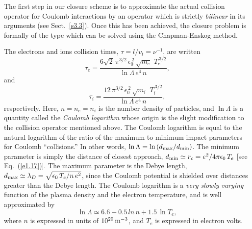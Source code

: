 The first step in our closure scheme is to approximate the actual collision
operator for Coulomb interactions by an operator which is strictly
{\em bilinear}\/ in its arguments (see Sect.~\ref{s3.3}). Once this has been achieved,
the closure problem is formally of the type which can be solved using the
Chapman-Enskog method. 

The electrons and ions collision times, $\tau = l/v_t = \nu^{-1}$, are
written
\begin{equation}\label{e3.74}
\tau_e = \frac{6\sqrt{2}\,\pi^{3/2}\,\epsilon_0^{~2}\,\sqrt{m_e}\,\,T_e^{~3/2}}
{\ln\Lambda\, e^4\, n},
\end{equation}
and
\begin{equation}\label{e3.75}
\tau_i = \frac{ 12\,\pi^{3/2}\,\epsilon_0^{~2}\,\sqrt{m_i}\,\,T_i^{~3/2}}
{\ln\Lambda\, e^4\, n},
\end{equation}
respectively. 
Here, $n=n_e=n_i$ is the number density of particles, and $\ln\Lambda$ is a quantity
called the {\em Coulomb logarithm}\/ whose origin is  the slight modification to the
collision operator  mentioned above. The Coulomb logarithm is equal to
the natural logarithm of the ratio of the maximum to minimum impact parameters
for Coulomb ``collisions.'' In other words, $\ln\Lambda=\ln\,(d_{\rm max}/d_{\rm min})$.
The minimum parameter is simply the distance of closest approach,
$d_{\rm min} \simeq r_c= e^2/4\pi\epsilon_0\,T_e$ [see Eq.~(\ref{e1.17})]. The
maximum parameter is the Debye length, $d_{\rm max} \simeq 
\lambda_D=\sqrt{\epsilon_0\,T_e/
n\,e^2}$, since the Coulomb potential is shielded over distances greater than
the Debye length. The Coulomb logarithm is a {\em very slowly varying}\/  function
of the plasma density and the electron temperature, and is well approximated by
\begin{equation}
\ln\Lambda \simeq 6.6 - 0.5 \, ln \,n + 1.5\,\ln T_e,
\end{equation}
where $n$ is expressed in units of $10^{20}\,{\rm m}^{-3}$, and $T_e$ is expressed in electron volts.

